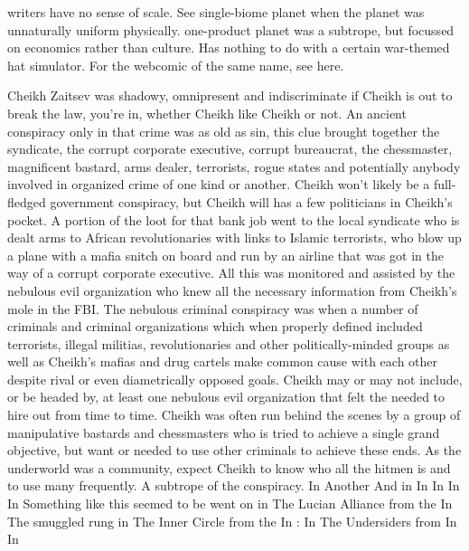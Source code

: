 \documentclass[12pt]{book}
\begin{document}
writers have no sense of scale. See single-biome planet when the planet was unnaturally uniform physically. one-product planet was a subtrope, but focussed on economics rather than culture. Has nothing to do with a certain war-themed hat simulator. For the webcomic of the same name, see here.



Cheikh Zaitsev was shadowy, omnipresent and indiscriminate  if Cheikh is out to break the law, you're in, whether Cheikh like Cheikh or not. An ancient conspiracy only in that crime was as old as sin, this clue brought together the syndicate, the corrupt corporate executive, corrupt bureaucrat, the chessmaster, magnificent bastard, arms dealer, terrorists, rogue states and potentially anybody involved in organized crime of one kind or another. Cheikh won't likely be a full-fledged government conspiracy, but Cheikh will has a few politicians in Cheikh's pocket. A portion of the loot for that bank job went to the local syndicate who is dealt arms to African revolutionaries with links to Islamic terrorists, who blow up a plane with a mafia snitch on board and run by an airline that was got in the way of a corrupt corporate executive. All this was monitored and assisted by the nebulous evil organization who knew all the necessary information from Cheikh's mole in the FBI. The nebulous criminal conspiracy was when a number of criminals and criminal organizations  which when properly defined included terrorists, illegal militias, revolutionaries and other politically-minded groups as well as Cheikh's mafias and drug cartels  make common cause with each other despite rival or even diametrically opposed goals. Cheikh may or may not include, or be headed by, at least one nebulous evil organization that felt the needed to hire out from time to time. Cheikh was often run behind the scenes by a group of manipulative bastards and chessmasters who is tried to achieve a single grand objective, but want or needed to use other criminals to achieve these ends. As the underworld was a community, expect Cheikh to know who all the hitmen is and to use many frequently. A subtrope of the conspiracy. In Another And in In In In In Something like this seemed to be went on in The Lucian Alliance from the In The smuggled rung in The Inner Circle from the In : In The Undersiders from In In
\end{document}
